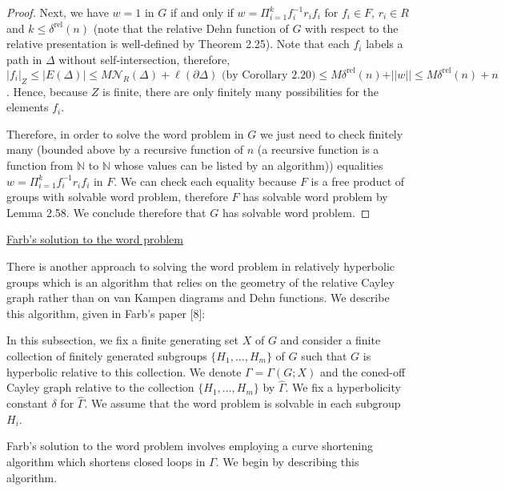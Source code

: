 \documentclass[12pt]{article}
\newcommand{\vs}{\vskip10pt}
\begin{document}
\begin{proof}
		\vs
		
		Next, we have $w = 1$ in $G$ if and only if $w = \Pi_{i=1}^k f_i^{-1} r_i f_i$ for $f_i \in F$, $r_i \in R$ and $k \leq \delta^{\text{rel}}(n)$ (note that the relative Dehn function of $G$ with respect to the relative presentation is well-defined by Theorem 2.25). Note that each $f_i$ labels a path in $\Delta$ without self-intersection, therefore, $ \vert f_i \vert_Z \leq \vert E(\Delta) \vert \leq M \mathcal{N}_R(\Delta) + \ell(\partial \Delta) \text{ (by Corollary 2.20)} \leq M \delta^{\text{rel}}(n) + \vert \vert w \vert \vert \leq M \delta^{\text{rel}}(n) + n$. Hence, because $Z$ is finite, there are only finitely many possibilities for the elements $f_i$. 
		
		\vs 
		
		Therefore, in order to solve the word problem in $G$ we just need to check finitely many (bounded above by a recursive function of $n$ (a recursive function is a function from $\mathbb{N}$ to $\mathbb{N}$ whose values can be listed by an algorithm)) equalities $w = \Pi_{i=1}^k f_i^{-1} r_i f_i$ in $F$. We can check each equality because $F$ is a free product of groups with solvable word problem, therefore $F$ has solvable word problem by Lemma 2.58. We conclude therefore that $G$ has solvable word problem. 
		
	\end{proof}

	\underline{Farb's solution to the word problem}
	
	\vs

	There is another approach to solving the word problem in relatively hyperbolic groups which is an algorithm that relies on the geometry of the relative Cayley graph rather than on van Kampen diagrams and Dehn functions. We describe this algorithm, given in Farb's paper [8]: 
	
	\vs
	
	In this subsection, we fix a finite generating set $X$ of $G$ and consider a finite collection of finitely generated subgroups $\{H_1,...,H_m\}$ of $G$ such that $G$ is hyperbolic relative to this collection. We denote $\Gamma =  \Gamma(G;X)$ and the coned-off Cayley graph relative to the collection $\{H_1,...,H_m\}$ by $\hat{\Gamma}$. We fix a hyperbolicity constant $\delta$ for $\hat{\Gamma}$. We assume that the word problem is solvable in each subgroup $H_i$. 
	
	\vs
	
	Farb's solution to the word problem involves employing a curve shortening algorithm which shortens closed loops in $\Gamma$. We begin by describing this algorithm. 
	
\end{document}
